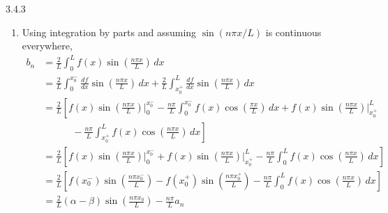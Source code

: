 \documentclass{article}
\theoremstyle{definition}
\begin{document}
	\begin{prob}{3.4.3} $  $
		\begin{enumerate}[label=\alph*.)]
			\item Using integration by parts and assuming $ \sin(n\pi x/L) $ is continuous everywhere,
				\begin{align*}
					b_n &= \frac{2}{L} \int_0^L f(x) \sin\left( \frac{n\pi x}{L} \right) \, dx \\
					&= \frac{2}{L} \int_{0}^{x_0^-} \frac{df}{dx} \sin\left( \frac{n\pi x}{L} \right) \, dx + \frac{2}{L} \int_{x_0^+}^{L} \frac{df}{dx} \sin\left( \frac{n\pi x}{L} \right) \, dx \\
					&= \frac{2}{L}\left[ f(x)\sin\left( \frac{n\pi x}{L} \right) \bigg|_{0}^{x_0^-} - \frac{n\pi}{L} \int_{0}^{x_0^-} f(x) \cos\left( \frac{\pi x}{L} \right) \, dx + f(x)\sin\left( \frac{n\pi x}{L} \right) \bigg|_{x_0^+}^{L} \right.\\
					& \left. \qquad \quad  - \frac{n\pi}{L} \int_{x_0^+}^{L} f(x)\cos\left( \frac{n\pi x}{L} \right) \, dx \right] \\
					&= \frac{2}{L} \left[ f(x)\sin\left( \frac{n\pi x}{L} \right) \bigg|_{0}^{x_0^-} + f(x)\sin\left( \frac{n\pi x}{L} \right) \bigg|_{x_0^+}^{L} - \frac{n\pi}{L} \int_{0}^{L} f(x)\cos\left( \frac{n\pi x}{L} \right) \, dx   \right] \\
					&= \frac{2}{L} \left[ f(x_0^-)\sin\left( \frac{n\pi x_0^-}{L} \right) - f(x_0^+)\sin\left( \frac{n\pi x_0^+}{L} \right) - \frac{n\pi}{L} \int_{0}^{L} f(x)\cos\left( \frac{n\pi x}{L} \right) \, dx  \right] \\
					&= \boxed{ \frac{2}{L} (\alpha - \beta) \sin\left( \frac{n\pi x_0}{L} \right) - \frac{n\pi}{L} a_n}
				\end{align*}
				

\end{enumerate}
\end{prob}
\end{document}
